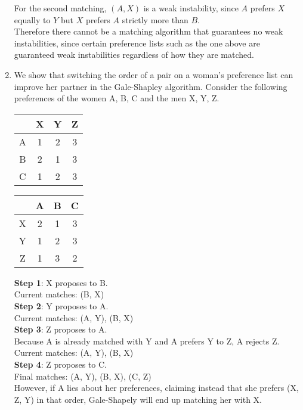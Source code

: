 \documentclass[oneside, 12pt]{article}
\begin{document}
\begin{enumerate}
\newline
For the second matching, $(A, X)$ is a weak instability, since $A$ prefers $X$ equally to $Y$ but $X$ prefers $A$ strictly more than $B$.\\
\newline
Therefore there cannot be a matching algorithm that guarantees no weak instabilities, since certain preference lists such as the one above are guaranteed weak instabilities regardless of how they are matched. 
\clearpage
\setcounter{enumi}{7}
\item
We show that switching the order of a pair on a woman's preference list can improve her partner in the Gale-Shapley algorithm. Consider the following preferences of the women A, B, C and the men X, Y, Z.
\begin{table}[htb]
\centering
\begin{tabular}{c | c c c}
& X & Y & Z \\
\hline
A & 1 & 2 & 3\\
B & 2 & 1 & 3\\
C & 1 & 2 & 3\\
\end{tabular}
\qquad
\begin{tabular}{c | c c c}
& A & B & C\\
\hline
X & 2 & 1 & 3\\
Y & 1 & 2 & 3\\
Z & 1 & 3 & 2\\
\end{tabular}
\end{table}
\newline
\textbf{Step 1}: X proposes to B.\\
Current matches: (B, X)\\
\textbf{Step 2}: Y proposes to A.\\
Current matches: (A, Y), (B, X)\\
\textbf{Step 3}: Z proposes to A.\\
Because A is already matched with Y and A prefers Y to Z,  A rejects Z.\\
Current matches: (A, Y), (B, X)\\
\textbf{Step 4}: Z proposes to C.\\
Final matches: (A, Y), (B, X), (C, Z)\\
\newline
However, if A lies about her preferences, claiming instead that she prefers (X, Z, Y) in that order, Gale-Shapely will end up matching her with X.
\begin{table}[htb]

\end{table}
\end{enumerate}
\end{document}
